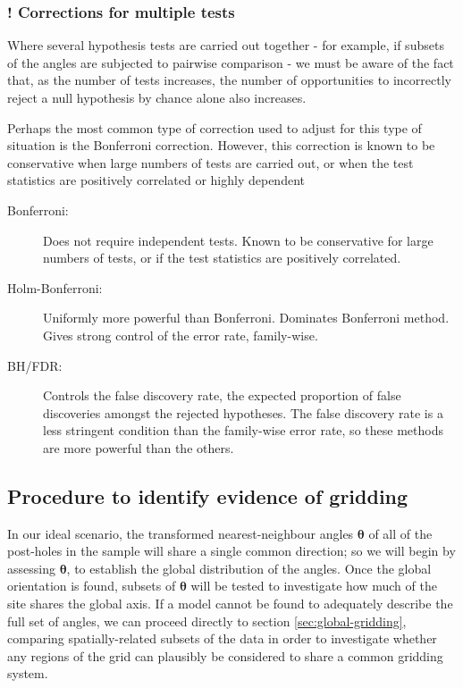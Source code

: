 \documentclass[../../ArchStats.tex]{subfiles}
\begin{document}
\subsubsection{! Corrections for multiple tests}

Where several hypothesis tests are carried out together - for example, if subsets of the angles are subjected to pairwise comparison - we must be aware of the fact that, as the number of tests increases, the number of opportunities to incorrectly reject a null hypothesis by chance alone also increases.

Perhaps the most common type of correction used to adjust for this type of situation is the Bonferroni correction. However, this correction is known to be conservative when large numbers of tests are carried out, or when the test statistics are positively correlated or highly dependent 


\begin{description}

\item[Bonferroni: ] Does not require independent tests. Known to be conservative for large numbers of tests, or if the test statistics are positively correlated.

\item[Holm-Bonferroni: ] Uniformly more powerful than Bonferroni. Dominates Bonferroni method. Gives strong control of the error rate, family-wise. \cite{Holm1979}

\item[BH/FDR: ] Controls the false discovery rate, the expected proportion of false discoveries amongst the rejected hypotheses. The false discovery rate is a less stringent condition than the family-wise error rate, so these methods are more powerful than the others. \cite{BH1995}

\end{description}

\subsection{Procedure to identify evidence of gridding}

In our ideal scenario, the transformed nearest-neighbour angles $\boldsymbol{\theta}$ of all of the post-holes in the sample will share a single common direction; so we will begin by assessing $\boldsymbol{\theta}$, to establish the global distribution of the angles. Once the global orientation is found, subsets of $\boldsymbol{\theta}$ will be tested to investigate how much of the site shares the global axis. If a model cannot be found to adequately describe the full set of angles, we can proceed directly to section \ref{sec:global-gridding}, comparing spatially-related subsets of the data in order to investigate whether any regions of the grid can plausibly be considered to share a common gridding system.
\end{document}

